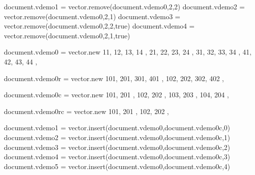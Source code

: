\typebuffer[option=TEX] \getbuffer

\startlinecorrection
{} {}
    {} {}
    {} {}
    {} {}
    {} {}
\stopcombination
\stoplinecorrection

\startbuffer
\startluacode
document.vdemo1 = vector.remove(document.vdemo0,2,2)
document.vdemo2 = vector.remove(document.vdemo0,2,1)
document.vdemo3 = vector.remove(document.vdemo0,2,2,true)
document.vdemo4 = vector.remove(document.vdemo0,2,1,true)
\stopluacode
\stopbuffer

\typebuffer[option=TEX] \getbuffer

\startlinecorrection
{} {}
    {} {}
    {} {}
    {} {}
    {} {}
\stopcombination
\stoplinecorrection

\startbuffer
\startluacode
document.vdemo0 = vector.new {
    { 11, 12, 13, 14 },
    { 21, 22, 23, 24 },
    { 31, 32, 33, 34 },
    { 41, 42, 43, 44 },
}

document.vdemo0r = vector.new {
    { 101, 201, 301, 401 },
    { 102, 202, 302, 402 },
}

document.vdemo0c = vector.new {
    { 101, 201 },
    { 102, 202 },
    { 103, 203 },
    { 104, 204 },
}

document.vdemo0rc = vector.new {
    { 101, 201 },
    { 102, 202 },
}
\stopluacode
\stopbuffer

\typebuffer[option=TEX] \getbuffer

\startlinecorrection
{}   {}
    {}  {}
    {}  {}
    {} {}
\stopcombination
\stoplinecorrection

\startbuffer
\startluacode
document.vdemo1 = vector.insert(document.vdemo0,document.vdemo0c,0)
document.vdemo2 = vector.insert(document.vdemo0,document.vdemo0c,1)
document.vdemo3 = vector.insert(document.vdemo0,document.vdemo0c,2)
document.vdemo4 = vector.insert(document.vdemo0,document.vdemo0c,3)
document.vdemo5 = vector.insert(document.vdemo0,document.vdemo0c,4)
\stopluacode
\stopbuffer

